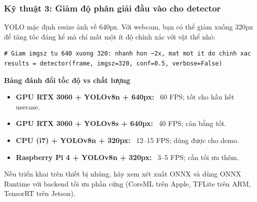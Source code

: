 \subsubsection{Kỹ thuật 3: Giảm độ phân giải đầu vào cho detector}
\label{subsubsec:rt_resolution}

YOLO mặc định resize ảnh về 640px. Với webcam, bạn có thể giảm xuống 320px để tăng tốc đáng kể mà chỉ mất một ít độ chính xác với vật thể nhỏ:

\begin{verbatim}
# Giam imgsz tu 640 xuong 320: nhanh hon ~2x, mat mot it do chinh xac
results = detector(frame, imgsz=320, conf=0.5, verbose=False)
\end{verbatim}

\begin{mdframed}[style=infobox]
\textbf{Bảng đánh đổi tốc độ vs chất lượng}

\begin{itemize}
    \item \textbf{GPU RTX 3060 + YOLOv8n + 640px:} ~60 FPS; tốt cho hầu hết usecase.
    \item \textbf{GPU RTX 3060 + YOLOv8s + 640px:} ~40 FPS; cân bằng tốt.
    \item \textbf{CPU (i7) + YOLOv8n + 320px:} ~12--15 FPS; dùng được cho demo.
    \item \textbf{Raspberry Pi 4 + YOLOv8n + 320px:} ~3--5 FPS; cần tối ưu thêm.
\end{itemize}

Nếu triển khai trên thiết bị nhúng, hãy xem xét xuất ONNX và dùng ONNX Runtime với backend tối ưu phần cứng (CoreML trên Apple, TFLite trên ARM, TensorRT trên Jetson).
\end{mdframed}
